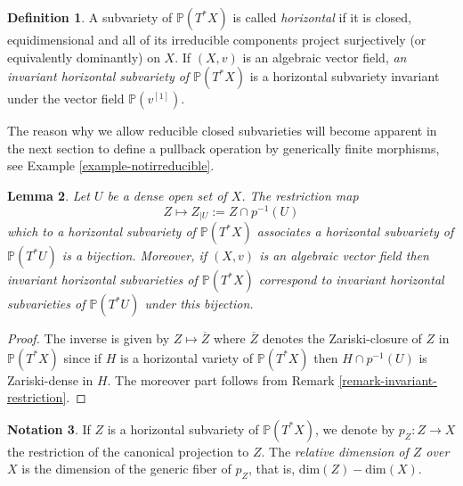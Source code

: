 \documentclass[12pt]{amsart}
\renewcommand{\P}{\mathbb{P}}
\theoremstyle{definition}
\newtheorem{definition}{Definition}[subsection]
\newtheorem{notation}[definition]{Notation}
\theoremstyle{plain}
\newtheorem{lemma}[definition]{Lemma}
\theoremstyle{exampstyle}
\theoremstyle{exampstyle}\newtheorem{thmxbis}{Theorem}
\numberwithin{equation}{section}
\theoremstyle{remark}
\begin{document}
\begin{definition} 
A subvariety of $\P(T^\ast X)$ is called \textit{horizontal} if it is closed, equidimensional and all of its irreducible components project surjectively (or equivalently dominantly) on $X$. If $(X,v)$ is an algebraic vector field, {\em an invariant horizontal subvariety of $\P(T^\ast X)$} is a horizontal subvariety invariant under the vector field $\P(v^{[1]})$.
\end{definition}

The reason why we allow reducible closed subvarieties will become apparent in the next section to define a pullback operation by generically finite morphisms, see Example \ref{example-notirreducible}. 

\begin{lemma} \label{lemma-horizontal-extension}
Let $U$ be a dense open set of $X$. The restriction map
$$Z \mapsto Z_{\mid U} := Z \cap p^{-1}(U)$$
which to a horizontal subvariety of $\P(T^\ast X)$ associates a horizontal subvariety of $\P(T^\ast U)$ is a bijection. Moreover, if $(X,v)$ is an algebraic vector field  then  invariant horizontal subvarieties of $\P(T^\ast X)$ correspond to invariant horizontal subvarieties of $\P(T^\ast U)$ under this bijection.
\end{lemma}  

\begin{proof} 
The inverse is given by $Z \mapsto \overline{Z}$ where $\overline{Z}$ denotes the Zariski-closure of $Z$ in $\P(T^\ast X)$ since if $H$ is a horizontal variety of $\P(T^\ast X)$ then $H \cap p^{-1}(U)$ is Zariski-dense in $H$. The moreover part follows from Remark \ref{remark-invariant-restriction}.  
\end{proof} 


\begin{notation} 
If $Z$ is a horizontal subvariety of $\P(T^\ast X)$, we denote by $p_Z: Z \rightarrow X$
the restriction of the canonical projection to $Z$. The {\em relative dimension of $Z$ over $X$} is the dimension of the generic fiber of $p_Z$, that is,  $\mathrm{dim}(Z) - \mathrm{dim}(X)$. 

\end{notation}
\end{document}
